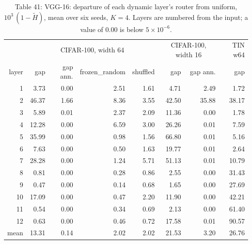 \documentclass{article}
\begin{document}
\begin{table}
\caption{Table 41: VGG-16: departure of each dynamic layer's router from uniform,
$10^3\,(1-\tilde H)$, mean over six seeds, $K=4$. Layers are numbered from
the input; a value of 0.00 is below $5\times10^{-6}$.}

\begin{tabular}{r rrrr rr r}
\toprule
& \multicolumn{4}{c}{CIFAR‑100, width 64} & \multicolumn{2}{c}{CIFAR‑100, width 16} & TIN w64 \\

layer & gap & gap ann. & frozen\_random & shuffled & gap & gap ann. & gap \\
\midrule
1 & 3.73 & 0.00 & 2.51 & 1.61 & 4.71 & 2.49 & 1.72 \\
2 & 46.37 & 1.66 & 8.36 & 3.55 & 42.50 & 35.88 & 38.17 \\
3 & 5.89 & 0.01 & 2.37 & 2.09 & 11.36 & 0.00 & 1.78 \\
4 & 12.28 & 0.00 & 6.59 & 3.00 & 26.26 & 0.01 & 7.59 \\
5 & 35.99 & 0.00 & 0.98 & 1.56 & 66.80 & 0.01 & 5.16 \\
6 & 7.63 & 0.00 & 0.50 & 1.63 & 19.77 & 0.01 & 2.64 \\
7 & 28.28 & 0.00 & 1.24 & 5.71 & 51.13 & 0.01 & 10.79 \\
8 & 0.81 & 0.00 & 0.28 & 0.86 & 2.55 & 0.00 & 31.43 \\
9 & 0.47 & 0.00 & 0.14 & 0.68 & 1.65 & 0.00 & 27.69 \\
10 & 17.09 & 0.00 & 0.47 & 2.20 & 11.90 & 0.00 & 42.21 \\
11 & 0.54 & 0.00 & 0.34 & 0.69 & 2.13 & 0.00 & 61.40 \\
12 & 0.63 & 0.00 & 0.46 & 0.72 & 17.58 & 0.01 & 90.57 \\
\midrule mean & 13.31 & 0.14 & 2.02 & 2.02 & 21.53 & 3.20 & 26.76 \\
\bottomrule
\end{tabular}
\end{table}
\end{document}
